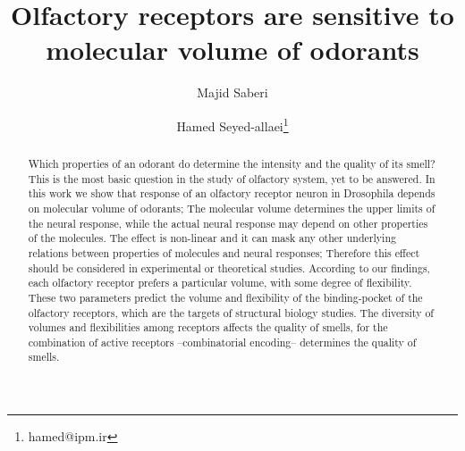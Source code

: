 \documentclass[11pt]{paper} %
\title{Olfactory receptors are sensitive to molecular volume of odorants}
\author{Majid Saberi \and Hamed Seyed-allaei\thanks{hamed@ipm.ir}}
\begin{document}

\maketitle

\begin{abstract}
        Which properties of an odorant do determine the intensity and the quality of its smell?
        This is the most basic question in the study of olfactory system, yet to be answered. 
	In this work we show that response of an olfactory receptor neuron in Drosophila depends on molecular volume of odorants; 
	The molecular volume determines the upper limits of the neural response, 
	while the actual neural response may depend on other properties of the molecules.
	The effect is non-linear and 
	it can mask any other underlying relations between properties of molecules and neural responses;
	Therefore this effect should be considered in experimental or theoretical studies.
	According to our findings, 
	each olfactory receptor prefers a particular volume, 
	with some degree of flexibility.
	These two parameters predict the volume and flexibility of the binding-pocket of the olfactory receptors, 
	which are the targets of structural biology studies. 	
	The diversity of volumes and flexibilities among receptors affects the quality of smells, 
	for the combination of active receptors --combinatorial encoding-- determines the quality of smells.
	

\end{abstract}
\end{document}
